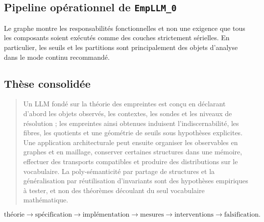\documentclass[11pt,a4paper]{article}
\theoremstyle{remark}
\begin{document}
\subsection{Pipeline opérationnel de \texttt{EmpLLM\_0}}
\begin{center}
\end{center}
Le graphe montre les responsabilités fonctionnelles et non une exigence que tous les composants soient exécutés comme des couches strictement sérielles. En particulier, les seuils et les partitions sont principalement des objets d'analyse dans le mode continu recommandé.

\subsection{Thèse consolidée}
\begin{quote}
Un LLM fondé sur la théorie des empreintes est conçu en déclarant d'abord les objets observés, les contextes, les sondes et les niveaux de résolution ; les empreintes ainsi obtenues induisent l'indiscernabilité, les fibres, les quotients et une géométrie de seuils sous hypothèses explicites. Une application architecturale peut ensuite organiser les observables en graphes et en maillage, conserver certaines structures dans une mémoire, effectuer des transports compatibles et produire des distributions sur le vocabulaire. La poly-sémanticité par partage de structures et la généralisation par réutilisation d'invariants sont des hypothèses empiriques à tester, et non des théorèmes découlant du seul vocabulaire mathématique.
\end{quote}

\[
\boxed{\text{théorie}\to\text{spécification}\to\text{implémentation}\to\text{mesures}\to\text{interventions}\to\text{falsification}.}
\]
\end{document}
